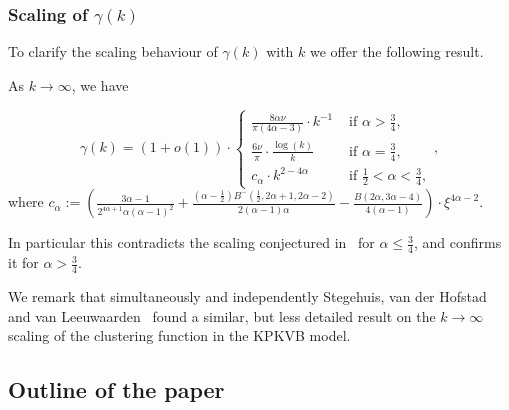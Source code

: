 
\subsubsection{Scaling of $\gamma(k)$}

To clarify the scaling behaviour of $\gamma(k)$ with $k$ we offer the following result.

\begin{proposition}\label{prop:asymp}
As $k\to\infty$, we have

$$ \gamma(k) = 
(1+o(1)) \cdot \left\{ \begin{array}{cl}
\frac{8\alpha \nu}{\pi\left(4\alpha - 3\right)} \cdot k^{-1} &\text{ if } \alpha > \frac{3}{4}, \\
\frac{6 \nu}{\pi} \cdot \frac{\log(k)}{k}& \text{ if } \alpha = \frac{3}{4},\\
 c_{\alpha} \cdot k^{2-4\alpha} & \text{ if } \frac12 < \alpha < \frac34, 
\end{array} \right.,
$$
where $c_{\alpha} := \left( \frac{3\alpha - 1}{2^{4\alpha+1}\alpha(\alpha-1)^2} 
	+ \frac{(\alpha - \frac{1}{2})B^-(\frac{1}{2},2\alpha + 1, 2\alpha - 2)}{2(\alpha - 1)\alpha} 
	- \frac{B(2\alpha, 3\alpha - 4)}{4(\alpha - 1)} \right)  \cdot \xi^{4\alpha-2}$.
\end{proposition}

In particular this contradicts the scaling conjectured in~\cite{krioukov2010hyperbolic} for $\alpha \leq \frac34$, and confirms it for $\alpha > \frac34$.

We remark that simultaneously and independently Stegehuis, van der Hofstad and van Leeuwaarden~\cite{stegehuis2018scale} found a similar, but less detailed result on the $k\to\infty$ scaling of the clustering function in the KPKVB model.




\subsection{Outline of the paper}


